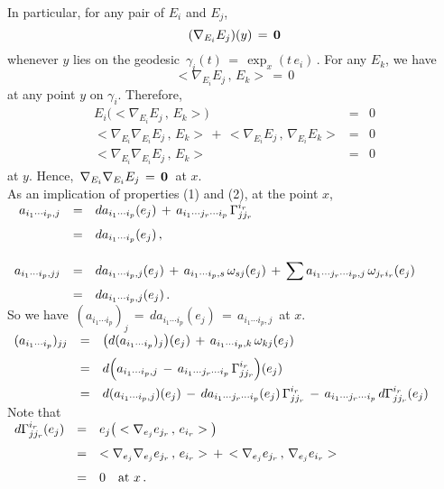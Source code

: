 \documentclass{article}[12pt,a4paper]
\begin{document}
In particular, for any pair of $E_i$ and $E_j$, 
$$ (\nabla_{E_i} E_j)(y) \,=\, {\bf 0} $$
whenever $y$ lies on the geodesic \,$\gamma_i(t) \,=\, \exp_x(t\,e_i)$\,. For any $E_k$, we have
$$ <\nabla_{E_i} E_j\,,\,E_k>\,=\, 0$$
at any point $y$ on $\gamma_i$. Therefore, 
$$ \begin{array}{rcl}
E_i\big(<\nabla_{E_i} E_j\,,\,E_k>\big) &=& 0 \\[0.1in]
<\nabla_{E_i}\nabla_{E_i} E_j\,,\,E_k> \,+\, <\nabla_{E_i} E_j\,,\,\nabla_{E_i}E_k> &=& 0 \\[0.1in]
<\nabla_{E_i}\nabla_{E_i} E_j\,,\,E_k> &=& 0
\end{array}$$
at $y$. Hence, \,$\nabla_{E_i}\nabla_{E_i} E_j\,=\,{\bf 0}$\, at $x$. \\[0.1in]

As an implication of properties (1) and (2), at the point $x$, \\[0.1in]
$\begin{array}{rcl}
a_{i_1\cdots i_p,j} &=& \displaystyle 
	da_{i_1\cdots i_p}(e_j) \,+\, a_{i_1\cdots j_r\cdots i_p}\, \Gamma_{jj_r}^{i_r} \\[0.1in]
&=& \displaystyle 
	da_{i_1\cdots i_p}(e_j)\,, \\[0.2in]
a_{i_1\cdots i_p,jj} &=& \displaystyle 
	da_{i_1\cdots i_p,j}(e_j) \,+\, a_{i_1\cdots i_p,s}\,\omega_{sj}(e_j) 
	\,+\, \sum a_{i_1\cdots j_r \cdots i_p,j}\, \omega_{j_ri_r}(e_j) \\[0.1in]
&=& \displaystyle 
	da_{i_1\cdots i_p,j}(e_j)\,.
\end{array} $ \\[0.1in]

So we have \,$(a_{i_1\cdots i_p})_j \,=\, da_{i_1\cdots i_p}(e_j) \,=\, a_{i_1\cdots i_p,j}$\, at $x$. \\[0.1in]
$\begin{array}{rcl}
(a_{i_1\cdots i_p})_{jj} &=& \displaystyle 
	\big(d(a_{i_1\cdots i_p})_j\big)(e_j) \,+\, a_{i_1\cdots i_p,k}\, \omega_{kj}(e_j) \\[0.1in]
&=& \displaystyle 
	d\Big(a_{i_1\cdots i_p,j} \,-\, a_{i_1\cdots j_r\cdots i_p}\, \Gamma_{jj_r}^{i_r}\Big)(e_j) \\[0.1in]
&=& \displaystyle 
	d(a_{i_1\cdots i_p,j})(e_j) \,-\, da_{i_1\cdots j_r\cdots i_p}(e_j)\, \Gamma_{jj_r}^{i_r} 
	\,-\, a_{i_1\cdots j_r\cdots i_p}\, d\Gamma_{jj_r}^{i_r}(e_j) \\
\end{array} $ \\[0.1in]

Note that \\[0.1in]
$\begin{array}{rcl}
d\Gamma_{jj_r}^{i_r}(e_j) &=& \displaystyle e_j\big(<\nabla_{e_j} e_{j_r}\,,\, e_{i_r}>\big) \\[0.1in]
&=& \displaystyle 
	<\nabla_{e_j}\nabla_{e_j} e_{j_r}\,,\, e_{i_r}> \,+\, <\nabla_{e_j} e_{j_r}\,,\, \nabla_{e_j}e_{i_r}> \\[0.1in]	
&=& \displaystyle 
	0 \quad \mbox{at }x\,. 
\end{array}$ \\
\newpage
\end{document}

